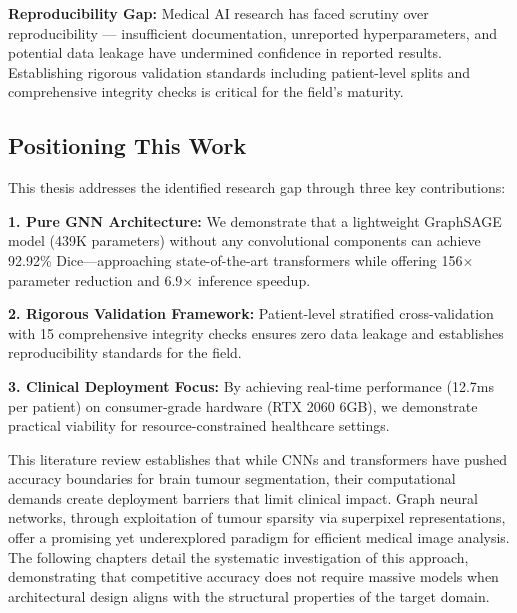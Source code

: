 \textbf{Reproducibility Gap:} Medical AI research has faced scrutiny over reproducibility — insufficient documentation, unreported hyperparameters, and potential data leakage have undermined confidence in reported results. Establishing rigorous validation standards including patient-level splits and comprehensive integrity checks is critical for the field's maturity.

\subsection{Positioning This Work}

This thesis addresses the identified research gap through three key contributions:

\textbf{1. Pure GNN Architecture:} We demonstrate that a lightweight GraphSAGE model (439K parameters) without any convolutional components can achieve 92.92\% Dice—approaching state-of-the-art transformers while offering 156$\times$ parameter reduction and 6.9$\times$ inference speedup.

\textbf{2. Rigorous Validation Framework:} Patient-level stratified cross-validation with 15 comprehensive integrity checks ensures zero data leakage and establishes reproducibility standards for the field.

\textbf{3. Clinical Deployment Focus:} By achieving real-time performance (12.7ms per patient) on consumer-grade hardware (RTX 2060 6GB), we demonstrate practical viability for resource-constrained healthcare settings.

\vspace{5mm}

This literature review establishes that while CNNs and transformers have pushed accuracy boundaries for brain tumour segmentation, their computational demands create deployment barriers that limit clinical impact. Graph neural networks, through exploitation of tumour sparsity via superpixel representations, offer a promising yet underexplored paradigm for efficient medical image analysis. The following chapters detail the systematic investigation of this approach, demonstrating that competitive accuracy does not require massive models when architectural design aligns with the structural properties of the target domain.

\clearpage